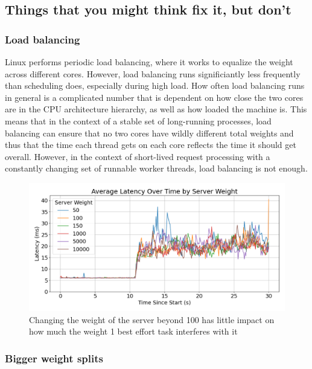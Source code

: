 \subsection{Things that you might think fix it, but don't}

\subsubsection{Load balancing}

Linux performs periodic load balancing, where it works to equalize the weight
across different cores. However, load balancing runs significiantly less
frequently than scheduling does, especially during high load. How often load
balancing runs in general is a complicated number that is dependent on how close
the two cores are in the CPU architecture hierarchy, as well as how loaded the
machine is. This means that in the context of a stable set of long-running
processes, load balancing can ensure that no two cores have wildly different
total weights and thus that the time each thread gets on each core reflects the
time it should get overall. However, in the context of short-lived request
processing with a constantly changing set of runnable worker threads, load
balancing is not enough.

\begin{figure}[t]
    \centering
    \includegraphics[width=\columnwidth]{graphs/srv-bg-weight-cmp-low.png}
    \caption{Changing the weight of the server beyond 100 has little impact on
    how much the weight 1 best effort task interferes with
    it}\label{fig:srv-bg-weight-cmp}
\end{figure}

\subsubsection{Bigger weight splits}

